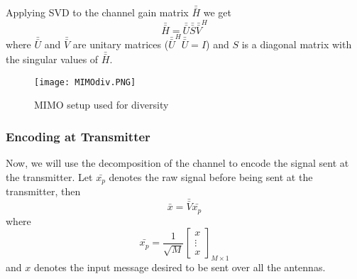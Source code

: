 Applying SVD to the channel gain matrix $\bar{\bar{H}}$ we get
\begin{equation}
    \label{eq:SVD H}
    \bar{\bar{H}} = \bar{\bar{U}} \bar{\bar{S}} \bar{\bar{V}}^H
\end{equation}
where $\bar{\bar{U}}$ and $\bar{\bar{V}}$ are unitary matrices ($\bar{\bar{U}}^H\bar{\bar{U}} = I$) and $S$ is a diagonal matrix with the singular values of $\bar{\bar{H}}$.
\begin{figure}[ht]
    \centering
    \texttt{[image: MIMOdiv.PNG]}
    \caption{MIMO setup used for diversity}
    \label{fig:MIMOdiv}
\end{figure}
\subsubsection{Encoding at Transmitter}
Now, we will use the decomposition of the channel to encode the signal sent at the transmitter. Let $\bar{x_p}$ denotes the raw signal before being sent at the transmitter, then 
\begin{equation}
    \label{eq:pre-coded x}
    \bar{x} = \bar{\bar{V}} \bar{x_p}
\end{equation}
where
\[ \bar{x_p} = \frac{1}{\sqrt{M}} \left[ \begin{array}{c}
    x \\
    \vdots \\
    x
\end{array} \right]_{M \times 1} \]
and $x$ denotes the input message desired to be sent over all the antennas.
